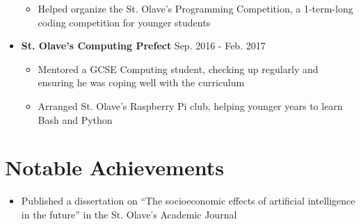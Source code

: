 \documentclass{moderncv}        %
\begin{document}
\begin{itemize}
\begin{itemize}
\vspace{3pt}

\item Helped organize the St. Olave’s Programming Competition, a 1-term-long coding competition for younger
students

\end{itemize}

\vspace{3pt}

\item \textbf{St. Olave’s Computing Prefect} \hfill Sep. 2016 - Feb. 2017

\begin{itemize}

\vspace{3pt}

\item Mentored a GCSE Computing student, checking up regularly and ensuring he was coping well with the curriculum

\vspace{3pt}

\item Arranged St. Olave’s Raspberry Pi club, helping younger years to learn Bash and Python

\end{itemize}

\end{itemize}

\section{Notable Achievements}

\begin{itemize}

\item Published a dissertation on “The socioeconomic effects of artificial intelligence in the future” in the St. Olave’s Academic Journal

\end{itemize}

\nocite{*}



\end{document}
